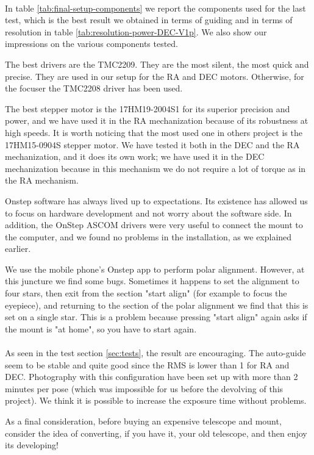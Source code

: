 \\
In table \ref{tab:final-setup-components} we report the components used for the last test, which is the best result we obtained in terms of guiding and in terms of resolution in table \ref{tab:resolution-power-DEC-V1p}.
We also show our impressions on the various components tested.

The best drivers are the TMC2209.
They are the most silent, the most quick and precise.
They are used in our setup for the RA and DEC motors.
Otherwise, for the focuser the TMC2208 driver has been used. 

The best stepper motor is the 17HM19-2004S1 for its superior precision and power, and we have used it in the RA mechanization because of its robustness at high speeds.
It is worth noticing that the most used one in others project is the 17HM15-0904S stepper motor.
We have tested it both in the DEC and the RA mechanization, and it does its own work;
we have used it in the DEC mechanization because in this mechanism we do not require a lot of torque as in the RA mechanism.

Onstep software has always lived up to expectations.
Its existence has allowed us to focus on hardware development and not worry about the software side.
In addition, the OnStep ASCOM drivers were very useful to connect the mount to the computer, and we found no problems in the installation, as we explained earlier.

We use the mobile phone’s Onstep app to perform polar alignment.
However, at this juncture we find some bugs.
Sometimes it happens to set the alignment to four stars, then exit from the section "start align" (for example to focus the eyepiece), and returning to the section of the polar alignment we find that this is set on a single star.
This is a problem because pressing "start align" again asks if the mount is "at home", so you have to start again.
\\
\\
As seen in the test section \ref{sec:tests}, the result are encouraging.
The auto-guide seem to be stable and quite good since the RMS is lower than 1 for RA and DEC.
Photography with this configuration have been set up with more than 2 minutes per pose (which was impossible for us before the devolving of this project).
We think it is possible to increase the exposure time without problems.

As a final consideration, before buying an expensive telescope and mount, consider the idea of converting, if you have it, your old telescope, and then enjoy its developing!